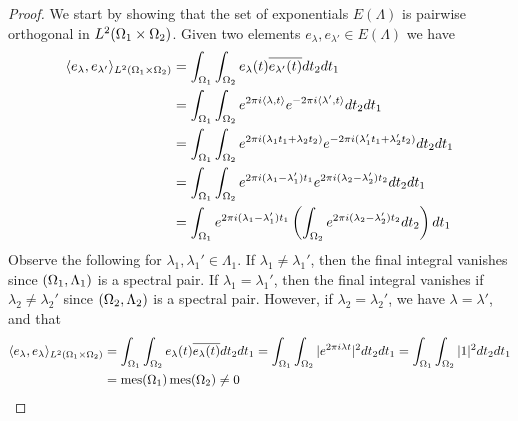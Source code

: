 \documentclass[../thesis.tex]{subfiles}
\begin{document}
\begin{proof}
    We start by showing that the set of exponentials $E(\Lambda)$
    is pairwise orthogonal in $L^2(\Omega_1 \times \Omega_2)$. Given two elements $e_\lambda,e_{\lambda'} \in E(\Lambda)$ we have %
    \begin{align*}
        \langle e_\lambda,e_{\lambda'}\rangle_{L^2(\Omega_1 \times \Omega_2)} 
        &= \int_{\Omega_1} \int_{\Omega_2} e_{\lambda}(t) \overline{e_{\lambda'}(t)} dt_2 dt_1\\ 
        &= \int_{\Omega_1} \int_{\Omega_2} e^{2\pi i \langle\lambda, t\rangle } e^{-2\pi i  \langle\lambda', t\rangle} dt_2 dt_1\\ 
        &= \int_{\Omega_1} \int_{\Omega_2} e^{2\pi i (\lambda_1 t_1+\lambda_2 t_2)} e^{-2\pi i(\lambda_1' t_1+\lambda_2' t_2)} dt_2 dt_1\\ 
        &= \int_{\Omega_1} \int_{\Omega_2} e^{2\pi i (\lambda_1- \lambda_1')t_1} e^{2\pi i (\lambda_2 - \lambda_2')t_2} dt_2 dt_1\\ 
        &= \int_{\Omega_1} e^{2\pi i  (\lambda_1- \lambda_1')t_1} \left(\int_{\Omega_2}  e^{2\pi i (\lambda_2 - \lambda_2')t_2} dt_2\right) dt_1
    \end{align*}
    Observe the following for $\lambda_1, \lambda_1' \in \Lambda_1$. If $\lambda_1 \neq \lambda_1'$, then the final integral vanishes since $(\Omega_1, \Lambda_1)$ is a spectral pair. If $\lambda_1 = \lambda_1'$, then the final integral vanishes if $\lambda_2 \neq \lambda_2'$ since $(\Omega_2, \Lambda_2)$ is a spectral pair. However, if $\lambda_2 = \lambda_2'$, we have $\lambda = \lambda'$, and that 
    \begin{align*}
        \langle e_\lambda, e_\lambda\rangle_{L^2(\Omega_1 \times \Omega_2)}
        &= \int_{\Omega_1} \int_{\Omega_2} e_{\lambda}(t) \overline{e_{\lambda}(t)} dt_2 dt_1
        =\int_{\Omega_1} \int_{\Omega_2} |e^{2 \pi i \lambda t}|^2 dt_2 dt_1
        = \int_{\Omega_1} \int_{\Omega_2} |1|^2 dt_2 dt_1\\
        &= \operatorname{mes}(\Omega_1)\operatorname{mes}(\Omega_2) \neq 0
    \end{align*}

\end{proof}
\end{document}
